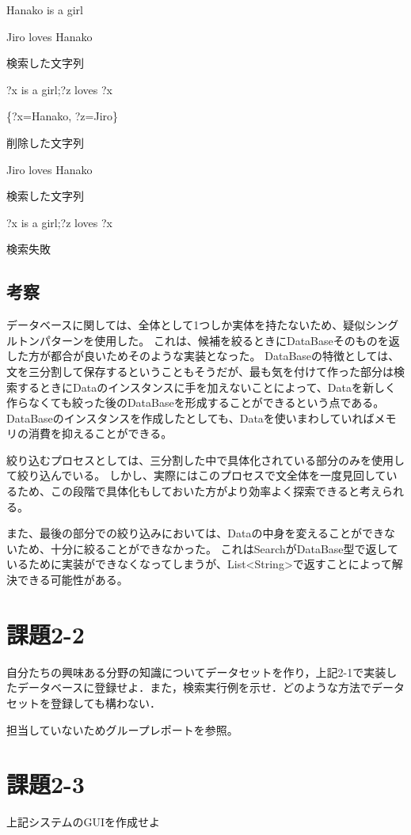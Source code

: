 \documentclass{jarticle}
\begin{document}
Hanako is a girl

Jiro loves Hanako


検索した文字列

?x is a girl;?z loves ?x

\{?x=Hanako, ?z=Jiro\}


削除した文字列

Jiro loves Hanako

検索した文字列

?x is a girl;?z loves ?x

検索失敗
\subsection{考察}
データベースに関しては、全体として1つしか実体を持たないため、疑似シングルトンパターンを使用した。
これは、候補を絞るときにDataBaseそのものを返した方が都合が良いためそのような実装となった。
DataBaseの特徴としては、文を三分割して保存するということもそうだが、最も気を付けて作った部分は検索するときにDataのインスタンスに手を加えないことによって、Dataを新しく作らなくても絞った後のDataBaseを形成することができるという点である。
DataBaseのインスタンスを作成したとしても、Dataを使いまわしていればメモリの消費を抑えることができる。

絞り込むプロセスとしては、三分割した中で具体化されている部分のみを使用して絞り込んでいる。
しかし、実際にはこのプロセスで文全体を一度見回しているため、この段階で具体化もしておいた方がより効率よく探索できると考えられる。

また、最後の部分での絞り込みにおいては、Dataの中身を変えることができないため、十分に絞ることができなかった。
これはSearchがDataBase型で返しているために実装ができなくなってしまうが、List<String>で返すことによって解決できる可能性がある。



\section{課題2-2}
\begin{screen}
  自分たちの興味ある分野の知識についてデータセットを作り，上記2-1で実装したデータベースに登録せよ．また，検索実行例を示せ．どのような方法でデータセットを登録しても構わない．
\end{screen}

担当していないためグループレポートを参照。


\section{課題2-3}
\begin{screen}
  上記システムのGUIを作成せよ
\end{screen}
\end{document}
